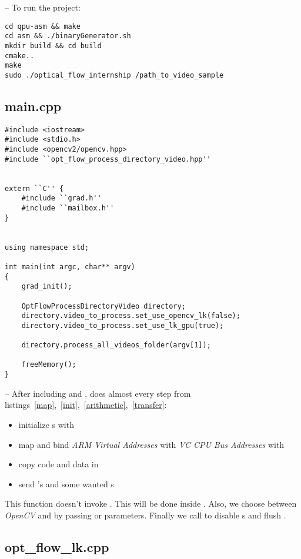 -- To run the project:
\begin{lstlisting}
cd qpu-asm && make
cd asm && ./binaryGenerator.sh
mkdir build && cd build
cmake..
make
sudo ./optical_flow_internship /path_to_video_sample
\end{lstlisting}


\subsection{main.cpp}

\begin{lstlisting}
#include <iostream>
#include <stdio.h>
#include <opencv2/opencv.hpp>
#include ``opt_flow_process_directory_video.hpp''


extern ``C'' {
	#include ``grad.h''
	#include ``mailbox.h''
}


using namespace std;

int main(int argc, char** argv)
{
	grad_init();

	OptFlowProcessDirectoryVideo directory;
	directory.video_to_process.set_use_opencv_lk(false);
	directory.video_to_process.set_use_lk_gpu(true);

	directory.process_all_videos_folder(argv[1]);

	freeMemory();
}
\end{lstlisting}

-- After including  and ,  does almost every step from listings~\ref{map},~\ref{init},~\ref{arithmetic},~\ref{transfer}:
\begin{itemize}
	\item initialize \qpu{}s with 
	\item map \ram{} and bind \emph{ARM Virtual Addresses} with \emph{VC CPU Bus Addresses} with 
	\item copy code and data in \ram
	\item send 's  and some wanted \uni{}s
\end{itemize}

This function doesn't invoke . This will be done inside . Also, we choose between \emph{OpenCV} and \api{} by passing  or  parameters. Finally we call  to disable \qpu{}s and flush \ram.


\subsection{opt\_flow\_lk.cpp}

